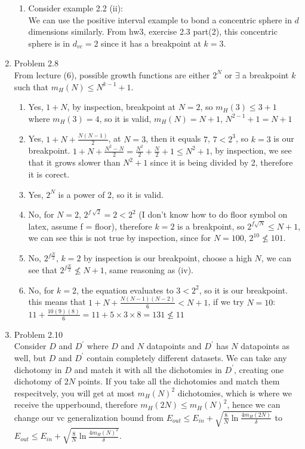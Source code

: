 \documentclass{article}
\begin{document}
\begin{enumerate}
\begin{enumerate}
            \item Consider example 2.2 (ii):\\
            We can use the positive interval example to bond a concentric sphere in $d$ dimensions similarly. From hw3, exercise 2.3 part(2), this concentric sphere is in $d_{vc} = 2$ since it has a breakpoint at $k = 3$.
        \end{enumerate}

        \item Problem 2.8\\
        From lecture (6), possible growth functions are either $2^N$ or $\exists$ a breakpoint $k$ such that $m_H(N) \leq N^{k-1} + 1$.
        \begin{enumerate}[label=(\roman*)]
            \item Yes, $1 + N$, by inspection, breakpoint at $N=2$, so $m_H(3) \leq 3 + 1$ where $m_H(3) = 4$, so it is valid, $m_H(N) = N + 1$, $N^{2-1} + 1 = N +1$
            \item Yes, $1 + N + \frac{N(N-1)}{2}$, at $N =3$, then it equals $7$, $7 < 2^3$, so $k = 3$ is our breakpoint. $1 + N + \frac{N^2 - N}{2} = \frac{N^2}{2} + \frac{N}{2} + 1 \leq N^2 + 1$, by inspection, we see that it grows slower than $N^2 + 1$ since it is being divided by 2, therefore it is corect.
            \item Yes, $2^N$ is a power of 2, so it is valid.
            \item No, for $N=2$, $2^{f\ \sqrt{2}} = 2 < 2^2$ (I don't know how to do floor symbol on latex, assume f = floor), therefore $k = 2$ is a breakpoint, so $2^{f \sqrt{N}} \leq N + 1$, we can see this is not true by inspection, since for $N = 100$, $2^{10} \nleq 101$.
            \item No, $2^{f\frac{N}{2}}$, $k = 2$ by inspection is our breakpoint, choose a high $N$, we can see that $2^{f\frac{N}{2}} \nleq N + 1$, same reasoning as (iv).
            \item No, for $k = 2$, the equation evaluates to $3 < 2^2$, so it is our breakpoint. this means that $1 + N + \frac{N(N-1)(N-2)}{6} < N + 1$, if we try $ N = 10$: $11 + \frac{10(9)(8)}{6} = 11 + 5 \times 3 \times 8 = 131 \nleq 11$
        \end{enumerate}

        \item Problem 2.10\\
        Consider $D$ and $D^\prime$ where $D$ and $N$ datapoints and $D^\prime$ has $N$ datapoints as well, but $D$ and $D^\prime$ contain completely different datasets. We can take any dichotomy in $D$ and match it with all the dichotomies in $D^\prime$, creating one dichotomy of $2N$ points. If you take all the dichotomies and match them respecitvely, you will get at most $m_H(N)^2$ dichotomies, which is where we receive the upperbound, therefore $m_H(2N) \leq m_H(N)^2$, hence we can change our vc generalization bound from $E_{out} \leq E_{in} + \sqrt{\frac{8}{N}\ln{\frac{4m_H(2N)}{\delta}}}$ to $E_{out} \leq E_{in} + \sqrt{\frac{8}{N}\ln{\frac{4m_H(N)^2}{\delta}}}$.


\end{enumerate}
\end{document}
